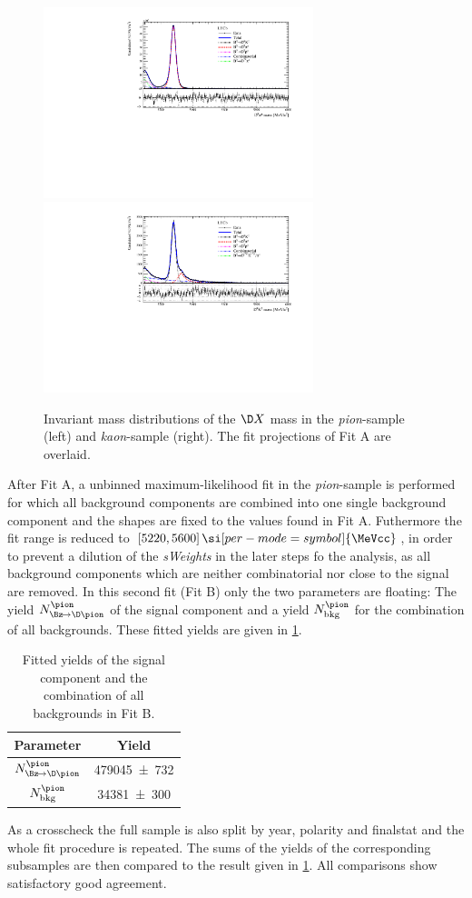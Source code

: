 \begin{figure}[tbp]
    \centering
    \includegraphics[width=0.7\textwidth]{07MassFit/figs/MDFit_BeautyMass_Bd2DPi_withPulls.pdf}
    \includegraphics[width=0.7\textwidth]{07MassFit/figs/MDFit_BeautyMass_Bd2DK_withPulls.pdf}
    \caption{Invariant mass distributions of the $\D X$ mass in the \emph{pion}-sample (left) and \emph{kaon}-sample (right).
    The fit projections of Fit A are overlaid.}
    \label{fig:MassFitPlot}
\end{figure}

After Fit A, a unbinned maximum-likelihood fit in the \emph{pion}-sample is performed for which all background components are combined into one single background component and the shapes are fixed to the values found in Fit A.
Futhermore the fit range is reduced to $[5220, 5600]\,\si[per-mode=symbol]{\MeVcc}$, in order to prevent a dilution of the \emph{sWeights} in the later steps fo the analysis, as all background components which are neither combinatorial nor close to the signal are removed.
In this second fit (Fit B) only the two parameters are floating: The yield $N_{\Bz\!\to\D\pion}^{\pion}$ of the signal \BdToDpi component and a yield $N_{\text{bkg}}^{\pion}$ for the combination of all backgrounds.
These fitted yields are given in \cref{tab:fittedSignalYield}.
\begin{table}[tbp]
	\centering
	\caption{Fitted yields of the signal \BdToDpi component and the combination of all backgrounds in Fit B.}
	\begin{tabular}{cc}
		\toprule
		Parameter & Yield \\
		\midrule
		$N_{\Bz\!\to\D\pion}^{\pion}$	& \num{479045\pm732} \\
		$N_{\text{bkg}}^{\pion}$		& \num{34381\pm300} \\
		\bottomrule
	\end{tabular}
	\label{tab:fittedSignalYield}
\end{table}

As a crosscheck the full sample is also split by year, polarity and finalstat and the whole fit procedure is repeated.
The sums of the yields of the corresponding subsamples are then compared to the result given in \cref{tab:fittedSignalYield}.
All comparisons show satisfactory good agreement.
